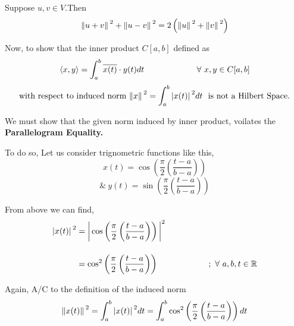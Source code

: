 \documentclass[12pt, a4paper]{article} %
\begin{document}



    \begin{tcolorbox}[colback=yellow!60!white, colframe=red!50!gray,title= Parallelogram Equality]

        Suppose $u, v\in V$.Then
        \newline
        \[\norm*{u+v}^2 + \norm*{u-v}^2 = 2\left(\norm*{u}^2 + \norm*{v}^2\right)\]
    \end{tcolorbox}

    \pagebreak

    Now, to show that the inner product $C[a,b]$ defined as
    \[\langle x, y \rangle = \int_{a}^{b}\overline{x(t)}\cdot y(t) dt\ \hspace*{2cm}\ \forall\ x,y\in C[a,b]\]
    \[\mbox{with respect to induced norm}\ \norm*{x}^2 = \int_{a}^{b}\abs*{x(t)}^2 dt\  \ \mbox{is not a Hilbert Space.}\]

    We must show that the given norm induced by inner product, voilates the {\bf Parallelogram Equality.}

    To do so, Let us consider trignometric functions like this,
    \[x(t) = \cos\left(\frac{\pi}{2}\left(\frac{t-a}{b-a}\right)\right)\]
    \[\&\ y(t) = \sin\left(\frac{\pi}{2}\left(\frac{t-a}{b-a}\right)\right)\]

    From above we can find,
    \begin{equation*}
        \begin{split}
            \abs*{{x(t)}}^2 & = \bigg|\cos\left(\frac{\pi}{2}\left(\frac{t-a}{b-a}\right)\right)\bigg|^2\\[4mm]
            & = \cos^2\left(\frac{\pi}{2}\left(\frac{t-a}{b-a}\right)\right) \hspace*{2cm}\ ;\ \forall\ a,b,t\in \mathbb{R}
        \end{split}
    \end{equation*}

    Again, A/C to the definition of the induced norm 
    \[\norm*{x(t)}^2 = \int_{a}^{b} \abs*{x(t)}^2 dt = \int_{a}^{b} \cos^2\left(\frac{\pi}{2}\left(\frac{t-a}{b-a}\right)\right) dt\]
\end{document}
